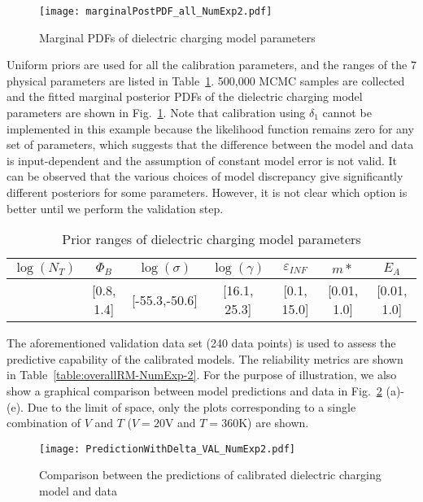 \documentclass[preprint,review,12pt,3p]{elsarticle}
\begin{document}
\begin{figure}[h!]
\centering
\texttt{[image: marginalPostPDF\_all\_NumExp2.pdf]}
\caption{Marginal PDFs of dielectric charging model parameters}
\label{figure:marginalDCmodel}
\end{figure}

Uniform priors are used for all the calibration parameters, and the ranges of the 7 physical parameters are listed in Table~\ref{table:priorRangeDielectricChargingParams}. 500,000 MCMC samples are collected and the fitted marginal posterior PDFs of the dielectric charging model parameters are shown in Fig.~\ref{figure:marginalDCmodel}. Note that calibration using $\delta_1$ cannot be implemented in this example because the likelihood function remains zero for any set of parameters, which suggests that the difference between the model and data is input-dependent and the assumption of constant model error is not valid. It can be observed that the various choices of model discrepancy give significantly different posteriors for some parameters. However, it is not clear which option is better until we perform the validation step. 



\begin{table}[h!]
\caption{Prior ranges of dielectric charging model parameters}
\label{table:priorRangeDielectricChargingParams}
\begin{center}
\begin{tabular}{ccccccc}
\hline
$\log(N_T)$ & $\Phi_B$ & $\log(\sigma)$ & $\log(\gamma)$ & $\varepsilon_{INF}$ & $m*$ & $E_A$ \\
\hline
[55.3, 61.5] & [0.8, 1.4] & [-55.3,-50.6] & [16.1, 25.3] & [0.1, 15.0] & [0.01, 1.0] & [0.01, 1.0] \\
\hline
\end{tabular}
\end{center}
\end{table}



The aforementioned validation data set (240 data points) is used to assess the predictive capability of the calibrated models. The reliability metrics are shown in Table~\ref{table:overallRM-NumExp-2}. For the purpose of illustration, we also show a graphical comparison between model predictions and data in Fig.~\ref{figure:predictionVAL-NumExp-2} (a)-(e). Due to the limit of space, only the plots corresponding to a single combination of $V$ and $T$ ($V=20$V and $T=360$K) are shown.
\begin{figure}[h!]
\centering
\texttt{[image: PredictionWithDelta\_VAL\_NumExp2.pdf]}
\caption{Comparison between the predictions of calibrated dielectric charging model and data}
\label{figure:predictionVAL-NumExp-2}
\end{figure}
\end{document}
